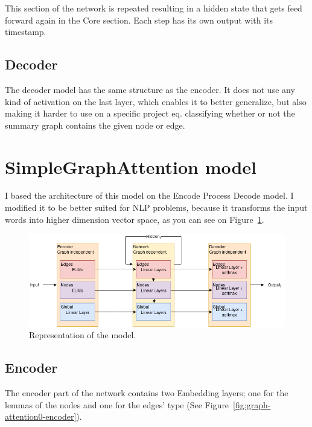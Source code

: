 This section of the network is repeated resulting in a hidden state that gets feed forward again in the Core section. Each step has its own output with its timestamp.

\subsection{Decoder}
The decoder model has the same structure as the encoder. It does not use any kind of activation on the last layer, which enables it to better generalize, but also making it harder to use on a specific project eq. classifying whether or not the summary graph contains the given node or edge.

\section{SimpleGraphAttention model}
I based the architecture of this model on the Encode Process Decode model. I modified it to be better suited for NLP problems, because it transforms the input words into higher dimension vector space, as you can see on Figure~\ref{fig:graph-attention0}.

\begin{figure}[!ht]
	\centering
	\includegraphics[width=150mm, keepaspectratio]{figures/GA0.png}
	\caption{Representation of the model.}
	\label{fig:graph-attention0}
\end{figure}

\subsection{Encoder}

The encoder part of the network contains two Embedding layers; one for the lemmas of the nodes and one for the edges' type (See Figure~\ref{fig:graph-attention0-encoder}). 

